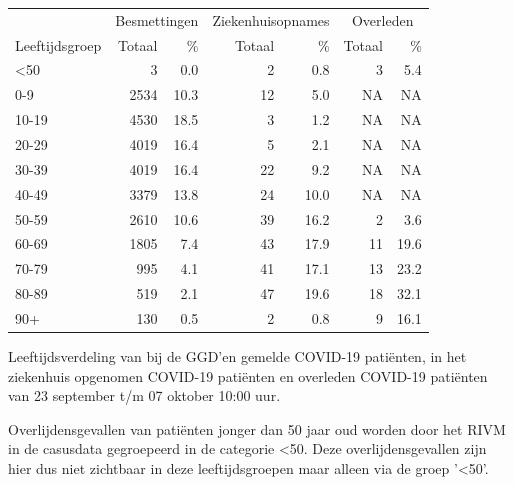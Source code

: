 \documentclass[
  english,
  man,floatsintext]{apa6}
\begin{document}
\begin{table}
\centering\begingroup\fontsize{11}{13}\selectfont

\begin{threeparttable}
\begin{tabular}{lrrrrrr}
\toprule
\multicolumn{1}{c}{ } & \multicolumn{2}{c}{Besmettingen} & \multicolumn{2}{c}{Ziekenhuisopnames} & \multicolumn{2}{c}{Overleden} \\
\cmidrule(l{3pt}r{3pt}){2-3} \cmidrule(l{3pt}r{3pt}){4-5} \cmidrule(l{3pt}r{3pt}){6-7}
Leeftijdsgroep & Totaal & \% & Totaal & \% & Totaal & \%\\
\midrule
<50 & 3 & 0.0 & 2 & 0.8 & 3 & 5.4\\
0-9 & 2534 & 10.3 & 12 & 5.0 & NA & NA\\
10-19 & 4530 & 18.5 & 3 & 1.2 & NA & NA\\
20-29 & 4019 & 16.4 & 5 & 2.1 & NA & NA\\
30-39 & 4019 & 16.4 & 22 & 9.2 & NA & NA\\
40-49 & 3379 & 13.8 & 24 & 10.0 & NA & NA\\
50-59 & 2610 & 10.6 & 39 & 16.2 & 2 & 3.6\\
60-69 & 1805 & 7.4 & 43 & 17.9 & 11 & 19.6\\
70-79 & 995 & 4.1 & 41 & 17.1 & 13 & 23.2\\
80-89 & 519 & 2.1 & 47 & 19.6 & 18 & 32.1\\
90+ & 130 & 0.5 & 2 & 0.8 & 9 & 16.1\\
\bottomrule
\end{tabular}
\begin{tablenotes}
\item[1] Leeftijdsverdeling van bij de GGD’en gemelde COVID-19 patiënten, in het ziekenhuis opgenomen COVID-19 patiënten en overleden COVID-19 patiënten van 23 september t/m 07 oktober 10:00 uur.
\item[2] Overlijdensgevallen van patiënten jonger dan 50 jaar oud worden door het RIVM in de casusdata gegroepeerd in de categorie <50. Deze overlijdensgevallen zijn hier dus niet zichtbaar in deze leeftijdsgroepen maar alleen via de groep '<50'.
\end{tablenotes}
\end{threeparttable}
\endgroup{}
\end{table}

\newpage
\end{document}
